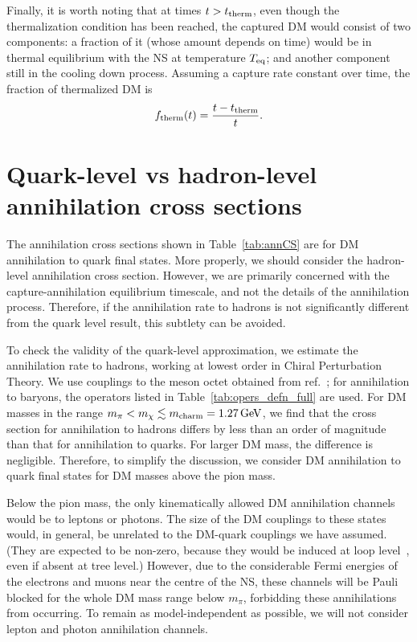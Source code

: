 Finally, it is worth noting that at times  $t>t_{\rm therm}$, even though the thermalization condition has been reached, the captured DM would consist of two components: a fraction of it (whose amount depends on time) would be in thermal equilibrium with the NS at temperature $T_{\rm eq}$; and another component still in the cooling down process. Assuming a  capture rate constant over time, the fraction of thermalized DM is 
\begin{equation}
    f_{\rm therm}(t) = \frac{t-t_{\rm therm}}{t}.
\end{equation}



\section{Quark-level vs hadron-level annihilation cross sections}
\label{sec:quarkhadron}

The annihilation cross sections shown in Table~\ref{tab:annCS} are for DM annihilation to quark final states.  More properly, we should consider the hadron-level annihilation cross section.
However, we are primarily concerned with the capture-annihilation equilibrium timescale, and not the details of the annihilation process. Therefore, if the annihilation rate to hadrons is not significantly different from the quark level result, this subtlety can be avoided. 

To check the validity of the quark-level approximation, we estimate the annihilation rate to hadrons, working at lowest order in Chiral Perturbation Theory. We use couplings to the meson octet obtained from  ref.~\cite{Kumar:2018heq_dec_IndirectDetectionSubGeV}; for annihilation to baryons, the operators listed in Table~\ref{tab:opers_defn_full} are used. 
For DM masses in the range $m_\pi < m_\chi \lesssim m_{\rm charm} = 1.27{\rm \,GeV}$, we find that the cross section for annihilation to hadrons differs by less than an order of magnitude than that for annihilation to quarks. For larger DM mass, the difference is negligible. Therefore, to simplify the discussion, we consider DM annihilation to quark final states for DM masses above the pion mass.


Below the pion mass, the only kinematically allowed DM annihilation channels would be to leptons or photons. The size of the DM couplings to these states would, in general, be unrelated to the DM-quark couplings we have assumed. (They are expected to be non-zero, because they would be induced at loop level~\cite{Bell:2019pyc_jun_CaptureLeptophilicDark}, even if absent at tree level.)
However, due to the considerable Fermi energies of the electrons and muons near the centre of the NS, these channels will be Pauli blocked for the whole DM mass range below $m_\pi$, forbidding these annihilations from occurring. To remain as model-independent as possible, we will not consider lepton and photon annihilation channels.

